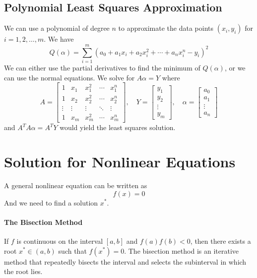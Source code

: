\documentclass{matharticle}
\begin{document}
\subsection{Polynomial Least Squares Approximation}
We can use a polynomial of degree $n$ to approximate the data points $(x_i, y_i)$ for $i = 1, 2, \ldots, m$. We have
\begin{equation*}
	Q(\alpha) = \sum_{i=1}^{m} \left( a_0 + a_1 x_i + a_2 x_i^2 + \cdots + a_n x_i^n - y_i \right)^2
\end{equation*}
We can either use the partial derivatives to find the minimum of $Q(\alpha)$, or we can use the normal equations. We solve for $A \alpha = Y$ where
\begin{equation}
	A = \begin{bmatrix}
		1      & x_1    & x_1^2  & \cdots & x_1^n  \\
		1      & x_2    & x_2^2  & \cdots & x_2^n  \\
		\vdots & \vdots & \vdots & \ddots & \vdots \\
		1      & x_m    & x_m^2  & \cdots & x_m^n
	\end{bmatrix}, \quad Y = \begin{bmatrix}
		y_1    \\
		y_2    \\
		\vdots \\
		y_m
	\end{bmatrix}, \quad \alpha = \begin{bmatrix}
		a_0    \\
		a_1    \\
		\vdots \\
		a_n
	\end{bmatrix}
\end{equation}
and $A^T A \alpha = A^T Y$ would yield the least squares solution.

\section{Solution for Nonlinear Equations}
A general nonlinear equation can be written as
\begin{equation}
	f(x) = 0
\end{equation}
And we need to find a solution $x^*$.

\paragraph{The Bisection Method}
If $f$ is continuous on the interval $[a, b]$ and $f(a) f(b) < 0$, then there exists a root $x^* \in (a, b)$ such that $f(x^*) = 0$. The bisection method is an iterative method that repeatedly bisects the interval and selects the subinterval in which the root lies.
\end{document}
